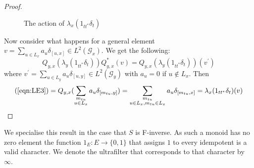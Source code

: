 \begin{proof}
\begin{figure}\label{fig:F1}





\caption{The action of $\lambda_{x}(1_{tt^{*}}\delta_{t})$}

\end{figure}

Now consider what happens for a general element $v = \sum_{u \in L_{x}} a_{u}\delta_{[u,x]} \in L^{2}(\mathcal{G}_{x})$. We get the following:
\begin{equation}\label{eqn:LE3}
Q_{y,x}(\lambda_{y}(1_{tt^{*}}\delta_{t}))Q_{y,x}^{*}(v)=Q_{y,x}(\lambda_{y}(1_{tt^{*}}\delta_{t}))(v^{'})
\end{equation}
where $v^{'}= \sum_{u \in L_{y}} a_{u}\delta_{[u,y]} \in L^{2}(\mathcal{G}_{y})$ with $a_{u}=0$ if $u \not \in L_{x}$. Then 
\begin{eqnarray*}
\mbox{(\ref{eqn:LE3})} = Q_{y,x}(\sum_{\substack{ m_{tu}\\ u \in L_{x}}} a_{u}\delta_{[m_{tu},y]})
=\sum_{\substack{ m_{tu}\\  u \in L_{x},m_{tu} \in L_{x}}}a_{u}\delta_{[m_{tu},x]}=\lambda_{x}(1_{tt^{*}}\delta_{t})(v)
\end{eqnarray*}
\end{proof}

We specialise this result in the case that $S$ is F-inverse. As such a monoid has no zero element the function $1_{E}: E \rightarrow \lbrace 0,1 \rbrace$ that assigns $1$ to every idempotent is a valid character. We denote the ultrafilter that corresponds to that character by $\infty$.

